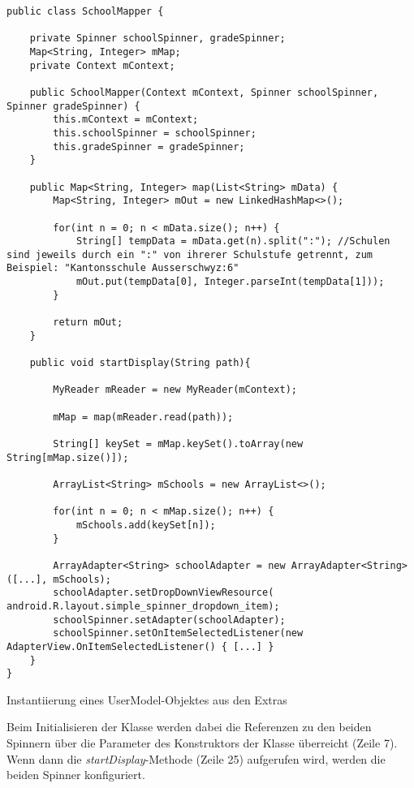 \documentclass[../main.tex]{subfiles}
\begin{document}
\begin{code}
	\begin{center}
		\begin{verbatim}
public class SchoolMapper {

	private Spinner schoolSpinner, gradeSpinner;
	Map<String, Integer> mMap;
	private Context mContext;

	public SchoolMapper(Context mContext, Spinner schoolSpinner, Spinner gradeSpinner) {
		this.mContext = mContext;
		this.schoolSpinner = schoolSpinner;
		this.gradeSpinner = gradeSpinner;
	}

	public Map<String, Integer> map(List<String> mData) {
		Map<String, Integer> mOut = new LinkedHashMap<>();

		for(int n = 0; n < mData.size(); n++) {
			String[] tempData = mData.get(n).split(":"); //Schulen sind jeweils durch ein ":" von ihrerer Schulstufe getrennt, zum Beispiel: "Kantonsschule Ausserschwyz:6"
			mOut.put(tempData[0], Integer.parseInt(tempData[1]));
		}
		
		return mOut;
	}

	public void startDisplay(String path){

		MyReader mReader = new MyReader(mContext);

		mMap = map(mReader.read(path));
	
		String[] keySet = mMap.keySet().toArray(new String[mMap.size()]);

		ArrayList<String> mSchools = new ArrayList<>();

		for(int n = 0; n < mMap.size(); n++) {
			mSchools.add(keySet[n]);
		}

		ArrayAdapter<String> schoolAdapter = new ArrayAdapter<String>([...], mSchools);
		schoolAdapter.setDropDownViewResource( android.R.layout.simple_spinner_dropdown_item);
		schoolSpinner.setAdapter(schoolAdapter);
		schoolSpinner.setOnItemSelectedListener(new AdapterView.OnItemSelectedListener() { [...] }
	}
}	
		\end{verbatim}
		\caption{Instantiierung eines UserModel-Objektes aus den Extras}
		\label{schoolMapper}
	\end{center}
\end{code}

	Beim Initialisieren der Klasse werden dabei die Referenzen zu den beiden Spinnern über die Parameter des Konstruktors der Klasse überreicht (Zeile 7). Wenn dann die \emph{startDisplay}-Methode (Zeile 25) aufgerufen wird, werden die beiden Spinner konfiguriert. 
	
\end{document}
